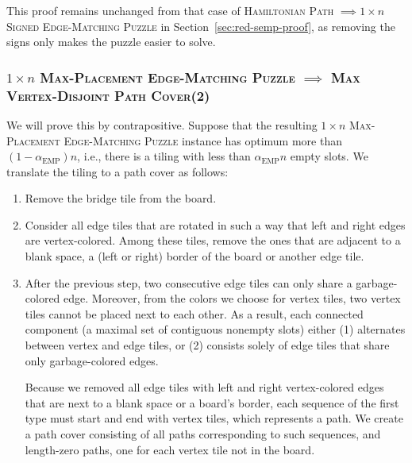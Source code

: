 \documentclass[11pt]{article}
\def\EMP{\mathrm{EMP}}
\begin{document}
This proof remains unchanged from that case of \textsc{Hamiltonian Path} $\implies $\textsc{$1 \times n$ Signed Edge-Matching Puzzle} in Section~\ref{sec:red-semp-proof}, as removing the signs only makes the puzzle easier to solve.

%

\subsubsection*{\textsc{$1 \times n$ Max-Placement Edge-Matching Puzzle} $\implies$ \textsc{Max Vertex-Disjoint Path Cover(2)}}

We will prove this by contrapositive. Suppose that the resulting \textsc{$1 \times n$ Max-Placement Edge-Matching Puzzle} instance has optimum more than $(1 - \alpha_{\EMP})n$, i.e., there is a tiling with less than $\alpha_{\EMP} n$ empty slots. We translate the tiling to a path cover as follows:
\begin{enumerate}
  \item Remove the bridge tile from the board. \label{step:bri}
	\item Consider all edge tiles that are rotated in such a way that left and right edges are vertex-colored. Among these tiles, remove the ones that are adjacent to a blank space, a (left or right) border of the board or another edge tile. \label{step:eli}
	\item After the previous step, two consecutive edge tiles can only share a garbage-colored edge. Moreover, from the colors we choose for vertex tiles, two vertex tiles cannot be placed next to each other. As a result, each connected component (a maximal set of contiguous nonempty slots) either (1) alternates between vertex and edge tiles, or (2) consists solely of edge tiles that share only garbage-colored edges.

	Because we removed all edge tiles with left and right vertex-colored edges that are next to a blank space or a board's border, each sequence of the first type must start and end with vertex tiles, which represents a path. We create a path cover consisting of all paths corresponding to such sequences, and length-zero paths, one for each vertex tile not in the board.
\end{enumerate}
\end{document}
